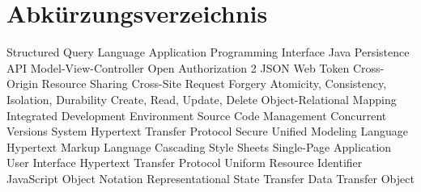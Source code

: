 \chapter{Abkürzungsverzeichnis}

			{Structured Query Language}
			{Application Programming Interface}
			{Java Persistence API}
			{Model-View-Controller}
		{Open Authorization 2}
			{JSON Web Token}
			{Cross-Origin Resource Sharing}
			{Cross-Site Request Forgery}
			{Atomicity, Consistency, Isolation, Durability}
			{Create, Read, Update, Delete}
			{Object-Relational Mapping}
			{Integrated Development Environment}
	      {Source Code Management }
			{Concurrent Versions System}
		{Hypertext Transfer Protocol Secure}
			{Unified Modeling Language}
			{Hypertext Markup Language}
			{Cascading Style Sheets}
			{Single-Page Application}
			{User Interface}
			{Hypertext Transfer Protocol}
			{Uniform Resource Identifier}
			{JavaScript Object Notation}
		{Representational State Transfer}
			{Data Transfer Object}


